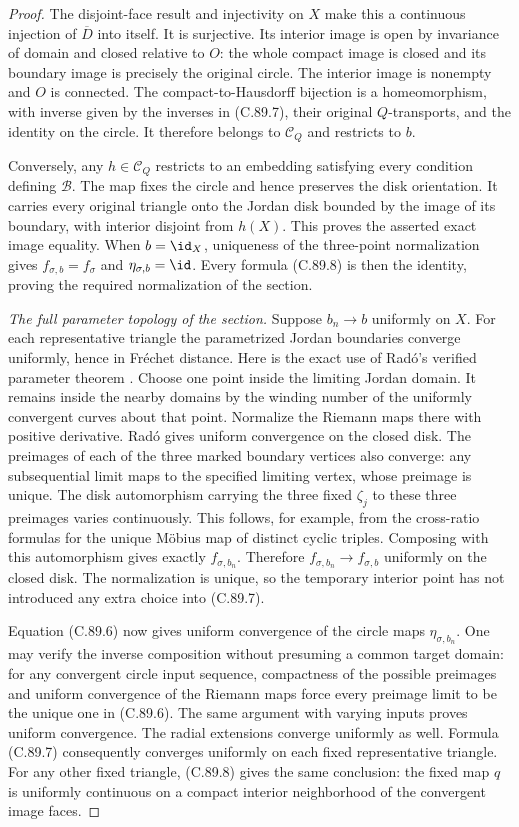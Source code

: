 \begin{proof}
The disjoint-face result and
injectivity on $X$ make this a
continuous injection of
$\overline D$ into itself.
It is surjective. Its interior
image is open by invariance of
domain and closed relative to $O$:
the whole compact image is closed
and its boundary image is precisely
the original circle.
The interior image is nonempty
and $O$ is connected.
The compact-to-Hausdorff bijection
is a homeomorphism, with inverse
given by the inverses in (C.89.7),
their original $Q$-transports, and
the identity on the circle.
It therefore belongs to
$\mathscr C_Q$ and restricts to $b$.

Conversely, any $h\in\mathscr C_Q$
restricts to an embedding satisfying
every condition defining $\mathscr B$.
The map fixes the circle and hence
preserves the disk orientation.
It carries every original triangle
onto the Jordan disk bounded by
the image of its boundary, with
interior disjoint from $h(X)$.
This proves the asserted exact
image equality.
When $b=\id_X$, uniqueness of
the three-point normalization gives
$f_{\sigma,b}=f_\sigma$ and
$\eta_{\sigma,b}=\id$.
Every formula (C.89.8) is then
the identity, proving the required
normalization of the section.

\emph{The full parameter topology of the section.}
Suppose $b_n\to b$ uniformly on $X$.
For each representative triangle
the parametrized Jordan boundaries
converge uniformly, hence in
Fr\'echet distance.
Here is the exact use of Rad\'o's
verified parameter theorem
\cite[\S1, p.~182; proof, pp.~183--186]{C_Rado1923Variable}.
Choose one point inside the limiting
Jordan domain. It remains inside
the nearby domains by the winding
number of the uniformly convergent
curves about that point.
Normalize the Riemann maps there
with positive derivative.
Rad\'o gives uniform convergence
on the closed disk.
The preimages of each of the
three marked boundary vertices
also converge: any subsequential
limit maps to the specified limiting
vertex, whose preimage is unique.
The disk automorphism carrying
the three fixed $\zeta_j$ to these
three preimages varies continuously.
This follows, for example, from
the cross-ratio formulas for the
unique M\"obius map of distinct
cyclic triples.
Composing with this automorphism
gives exactly $f_{\sigma,b_n}$.
Therefore
$f_{\sigma,b_n}\to f_{\sigma,b}$
uniformly on the closed disk.
The normalization is unique, so
the temporary interior point has
not introduced any extra choice
into (C.89.7).

Equation (C.89.6) now gives uniform
convergence of the circle maps
$\eta_{\sigma,b_n}$.
One may verify the inverse
composition without presuming a
common target domain: for any
convergent circle input sequence,
compactness of the possible
preimages and uniform convergence
of the Riemann maps force every
preimage limit to be the unique
one in (C.89.6).
The same argument with varying
inputs proves uniform convergence.
The radial extensions converge
uniformly as well.
Formula (C.89.7) consequently
converges uniformly on each fixed
representative triangle.
For any other fixed triangle,
(C.89.8) gives the same conclusion:
the fixed map $q$ is uniformly
continuous on a compact interior
neighborhood of the convergent
image faces.


\end{proof}
